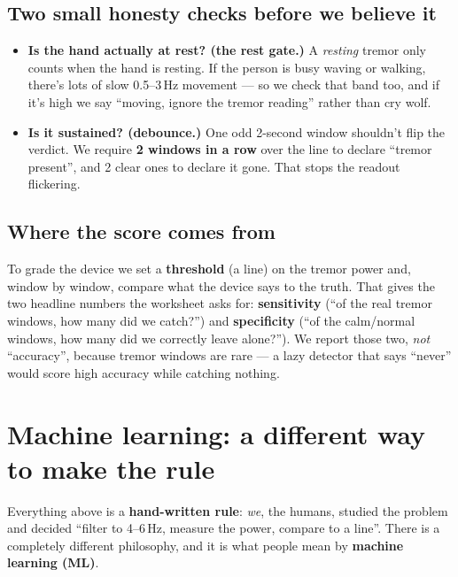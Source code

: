 \documentclass[11pt]{article}
\begin{document}
\subsection*{Two small honesty checks before we believe it}
\begin{itemize}
  \item \textbf{Is the hand actually at rest? (the rest gate.)} A
        \emph{resting} tremor only counts when the hand is resting. If the
        person is busy waving or walking, there's lots of slow 0.5--3\,Hz
        movement --- so we check that band too, and if it's high we say
        ``moving, ignore the tremor reading'' rather than cry wolf.
  \item \textbf{Is it sustained? (debounce.)} One odd 2-second window shouldn't
        flip the verdict. We require \textbf{2 windows in a row} over the line
        to declare ``tremor present'', and 2 clear ones to declare it gone. That
        stops the readout flickering.
\end{itemize}

\subsection*{Where the score comes from}
To grade the device we set a \textbf{threshold} (a line) on the tremor power and,
window by window, compare what the device says to the truth. That gives the two
headline numbers the worksheet asks for:
\textbf{sensitivity} (``of the real tremor windows, how many did we catch?'')
and \textbf{specificity} (``of the calm/normal windows, how many did we
correctly leave alone?''). We report those two, \emph{not} ``accuracy'', because
tremor windows are rare --- a lazy detector that says ``never'' would score high
accuracy while catching nothing.

\section{Machine learning: a different way to make the rule}

Everything above is a \textbf{hand-written rule}: \emph{we}, the humans, studied
the problem and decided ``filter to 4--6\,Hz, measure the power, compare to a
line''. There is a completely different philosophy, and it is what people mean
by \textbf{machine learning (ML)}.
\end{document}

